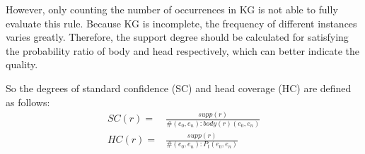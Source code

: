 \documentclass{article}
\begin{document}
	However, only counting the number of occurrences in KG is not able to fully evaluate this rule. Because KG is incomplete, the frequency of different instances varies greatly. Therefore, the support degree should be calculated for satisfying the probability ratio of body and head respectively, which can better indicate the quality.
	
	So the degrees of standard confidence (SC) and head coverage (HC) are defined as follows: 
	\begin{align}
		SC(r) =& \frac{supp(r)}{\#(e_0, e_n):body(r)(e_0, e_n)}\\
		HC(r) =& \frac{supp(r)}{\#(e_0, e_n):P_t( e_0, e_n)}
	\end{align}
	
	
%	
%	
\end{document}
